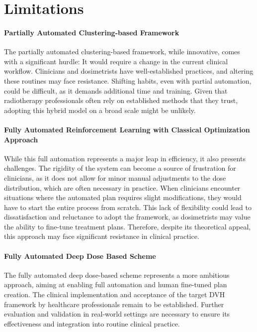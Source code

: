 \section{Limitations}
\paragraph{Partially Automated Clustering-based Framework}
The partially automated clustering-based framework, while innovative, comes with a significant hurdle:
It would require a change in the current clinical workflow.
Clinicians and dosimetrists have well-established practices, and altering these routines may face resistance.
Shifting habits, even with partial automation, could be difficult, as it demands additional time and training.
Given that radiotherapy professionals often rely on established methods that they trust, adopting this hybrid model on a broad scale might be unlikely.

\paragraph{Fully Automated Reinforcement Learning with Classical Optimization Approach}
While this full automation represents a major leap in efficiency, it also presents challenges.
The rigidity of the system can become a source of frustration for clinicians, as it does not allow for minor manual adjustments to the dose distribution, which are often necessary in practice.
When clinicians encounter situations where the automated plan requires slight modifications, they would have to start the entire process from scratch.
This lack of flexibility could lead to dissatisfaction and reluctance to adopt the framework, as dosimetrists may value the ability to fine-tune treatment plans.
Therefore, despite its theoretical appeal, this approach may face significant resistance in clinical practice.

\paragraph{Fully Automated Deep Dose Based Scheme}
The fully automated deep dose-based scheme represents a more ambitious approach, aiming at enabling full automation and human fine-tuned plan creation.
The clinical implementation and acceptance of the target DVH framework by healthcare professionals remain to be established.
Further evaluation and validation in real-world settings are necessary to ensure its effectiveness and integration into routine clinical practice.

